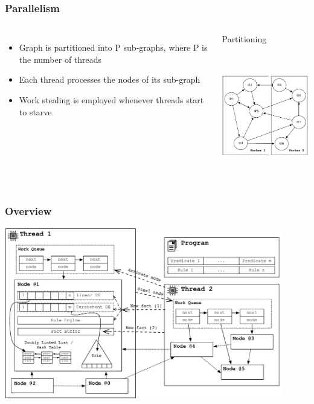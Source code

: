 \documentclass{beamer}
\begin{document}
\begin{frame}[fragile]
   \frametitle{Parallelism}
  \begin{columns}[t]
{\small
      \begin{itemize}
      \item Graph is partitioned into P sub-graphs, where P is the number of threads
      \item Each thread processes the nodes of its sub-graph
      \item Work stealing is employed whenever threads start to starve
      \end{itemize}
}
       \begin{block}{Partitioning}
       \begin{center}
          \includegraphics[height=5.5cm]{graph_coordination.pdf}
          \end{center}
       \end{block}
   \end{columns}
\end{frame}

\begin{frame}[fragile]
   \frametitle{Overview}
   \includegraphics[height=7.5cm]{overview.pdf}
\end{frame}
\end{document}

